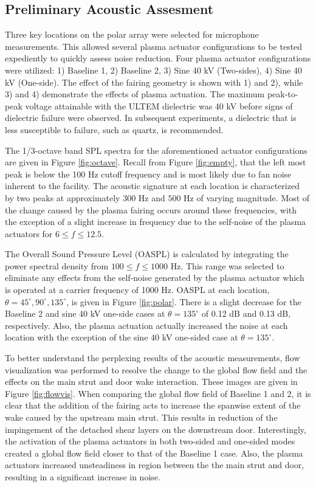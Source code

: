 \subsection{Preliminary Acoustic Assesment}
Three key locations on the polar array were selected for microphone measurements. This allowed several plasma actuator configurations to be tested expediently to quickly assess noise reduction. Four plasma actuator configurations were utilized: 1) Baseline 1, 2) Baseline 2, 3) Sine 40 kV (Two-sides), 4) Sine 40 kV (One-side). The effect of the fairing geometry is shown with 1) and 2), while 3) and 4) demonstrate the effects of plasma actuation. The maximum peak-to-peak voltage attainable with the ULTEM dielectric was 40 kV before signs of dielectric failure were observed. In subsequent experiments, a dielectric that is less susceptible to failure, such as quartz, is recommended. 

The 1/3-octave band SPL spectra for the aforementioned actuator configurations are given in Figure \ref{fig:octave}. Recall from Figure \ref{fig:empty}, that the left most peak is below the 100 Hz cutoff frequency and is most likely due to fan noise inherent to the facility. The acoustic signature at each location is characterized by two peaks at approximately $300$ Hz and $500$ Hz of varying magnitude. Most of the change caused by the plasma fairing occurs around these frequencies, with the exception of a slight increase in frequency due to the self-noise of the plasma actuators for $6 \leq f \leq 12.5$. 

The Overall Sound Pressure Level (OASPL) is calculated by integrating the power spectral density from $100 \leq f \leq 1000$ Hz. This range was selected to eliminate any effects from the self-noise generated by the plasma actuator which is operated at a carrier frequency of 1000 Hz. OASPL at each location, $\theta = 45^\circ, 90^\circ, 135^\circ$, is given in Figure \ref{fig:polar}. There is a slight decrease for the Baseline 2 and sine 40 kV one-side cases at $\theta = 135^\circ$ of 0.12 dB and 0.13 dB, respectively. Also, the plasma actuation actually increased the noise at each location with the exception of the sine 40 kV one-sided case at $\theta = 135^\circ$. 

To better understand the perplexing results of the acoustic measurements, flow visualization was performed to resolve the change to the global flow field and the effects on the main strut and door wake interaction. These images are given in Figure \ref{fig:flowvis}.  When comparing the global flow field of Baseline 1 and 2, it is clear that the addition of the fairing acts to increase the spanwise extent of the wake caused by the upstream main strut. This results in reduction of the impingement of the detached shear layers on the downstream door. Interestingly, the activation of the plasma actuators in both two-sided and one-sided modes created a global flow field closer to that of the Baseline 1 case. Also, the plasma actuators increased unsteadiness in region between the the main strut and door, resulting in a significant increase in noise. 

